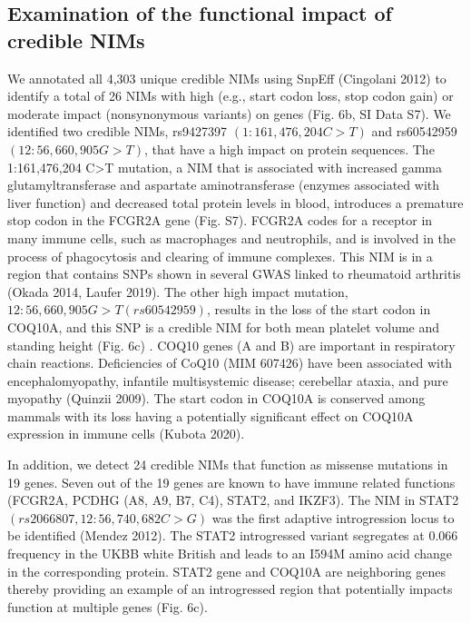 \subsection{Examination of the functional impact of credible NIMs}
We annotated all 4,303 unique credible NIMs using SnpEff (Cingolani 2012) to identify a total of 26 NIMs with high (e.g., start codon loss, stop codon gain) or moderate impact (nonsynonymous variants) on genes (Fig. 6b, SI Data S7). We identified two credible NIMs, rs9427397 $(1:161,476,204 C>T)$ and rs60542959 $(12:56,660,905 G>T)$, that have a high impact on protein sequences. The 1:161,476,204 C>T mutation, a NIM that is associated with increased gamma glutamyltransferase and aspartate aminotransferase (enzymes associated with liver function) and decreased total protein levels in blood, introduces a premature stop codon in the FCGR2A gene (Fig. S7). FCGR2A codes for a receptor in many immune cells, such as macrophages and neutrophils, and is involved in the process of phagocytosis and clearing of immune complexes. This NIM is in a region that contains SNPs shown in several GWAS  linked to rheumatoid arthritis (Okada 2014, Laufer 2019). The other high impact mutation, $12:56,660,905 G>T (rs60542959)$, results in the loss of the start codon in COQ10A, and this SNP is a credible NIM for both mean platelet volume and standing height (Fig. 6c) . COQ10 genes (A and B) are important in respiratory chain reactions. Deficiencies of CoQ10 (MIM 607426) have been associated with encephalomyopathy, infantile multisystemic disease; cerebellar ataxia, and pure myopathy (Quinzii 2009). The start codon in COQ10A is conserved among mammals with its loss having a potentially significant effect on COQ10A expression in immune cells (Kubota 2020).

In addition, we detect 24 credible NIMs that function as missense mutations in 19 genes. Seven out of the 19 genes are known to have immune related functions (FCGR2A, PCDHG (A8, A9, B7, C4), STAT2, and IKZF3).  The NIM in STAT2 $(rs2066807, 12:56,740,682 C>G)$ was the first adaptive introgression locus to be identified (Mendez 2012). The STAT2 introgressed variant segregates at 0.066 frequency in the UKBB white British and leads to an I594M amino acid change in the corresponding protein. STAT2 gene and COQ10A are neighboring genes thereby providing an example of an introgressed region that potentially impacts function at multiple genes (Fig. 6c). 

